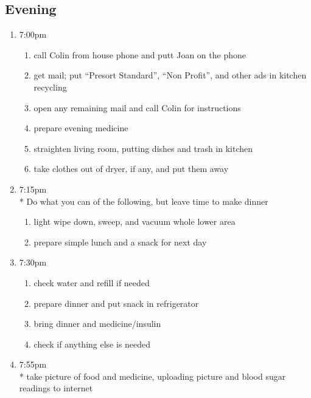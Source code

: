 \documentclass[12pt,letterpaper]{article}
\begin{document}
\begin{multicols}{2}
\subsection*{Evening}
\begin{enumerate}
	\item 7:00pm
		\begin{enumerate}
			\item call Colin from house phone and putt Joan on the phone
			\item get mail; put ``Presort Standard'', ``Non Profit'', and other ads in kitchen recycling
			\item open any remaining mail and call Colin for instructions
			\item prepare evening medicine
			\item straighten living room, putting dishes and trash in kitchen
			\item take clothes out of dryer, if any, and put them away
		\end{enumerate}
	\item 7:15pm \\*
		Do what you can of the following, but leave time to make dinner
		\begin{enumerate}
			\item light wipe down, sweep, and vacuum whole lower area
			\item prepare simple lunch and a snack for next day
		\end{enumerate}
	\item 7:30pm
		\begin{enumerate}
			\item check water and refill if needed
			\item prepare dinner and put snack in refrigerator
			\item bring dinner and medicine/insulin
			\item check if anything else is needed
		\end{enumerate}
	\item 7:55pm \\*
		take picture of food and medicine, uploading picture and blood sugar readings to internet
\end{enumerate}
\end{multicols}
\end{document}
